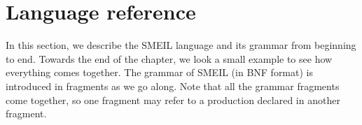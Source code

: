 




\section{Language reference}
\label{sec:langref}
In this section, we describe the SMEIL language and its grammar from beginning
to end. Towards the end of the chapter, we look a small example to see how
everything comes together. The grammar of SMEIL (in BNF format) is introduced in
fragments as we go along. Note that all the grammar fragments come together, so
one fragment may refer to a production declared in another fragment.




